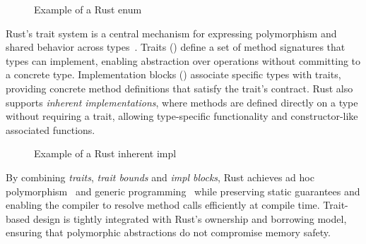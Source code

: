 \begin{figure}[htbp!]
	\centering
	\begin{minipage}{0.49\textwidth}
		\centering
		\captionsetup{type=listing,skip=2pt}
		\caption{Example of a Rust struct}
	\end{minipage}
	\hfill
	\begin{minipage}{0.49\textwidth}
		\centering
		\captionsetup{type=listing,skip=2pt}
		\caption{Example of a Rust enum}
	\end{minipage}
	\label{fig:structs-enums}
\end{figure}

Rust's trait system is a central mechanism for expressing polymorphism and shared behavior across types~\cite{RustBook,Matsakis14}.
Traits () define a set of method signatures that types can implement, enabling abstraction over operations without committing to a concrete type.
Implementation blocks () associate specific types with traits, providing concrete method definitions that satisfy the trait's contract.
Rust also supports \textit{inherent implementations}, where methods are defined directly on a type without requiring a trait, allowing type-specific functionality and constructor-like associated functions.

\begin{figure}[htbp!]
	\centering
	\begin{minipage}{0.49\textwidth}
		\centering
		\captionsetup{type=listing,skip=2pt}
		\caption{Example of a Rust trait impl}
	\end{minipage}
	\hfill
	\begin{minipage}{0.49\textwidth}
		\centering
		\captionsetup{type=listing,skip=2pt}
		\caption{Example of a Rust inherent impl}
	\end{minipage}
	\label{fig:traits-impls}
\end{figure}

By combining \textit{traits}, \textit{trait bounds} and \textit{impl blocks}, Rust achieves ad hoc polymorphism~\cite{Cardelli85,Wadler90} and generic programming~\cite{Musser89,Backhouse99} while preserving static guarantees and enabling the compiler to resolve method calls efficiently at compile time.
Trait-based design is tightly integrated with Rust's ownership and borrowing model, ensuring that polymorphic abstractions do not compromise memory safety.

